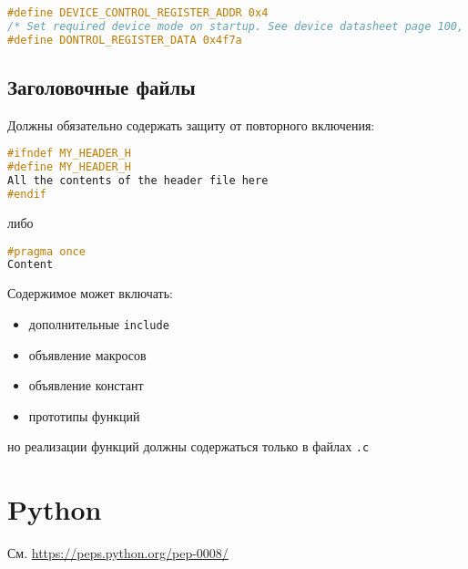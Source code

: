 \begin{lstlisting}[language=C]
#define DEVICE_CONTROL_REGISTER_ADDR 0x4
/* Set required device mode on startup. See device datasheet page 100, table 20. */
#define DONTROL_REGISTER_DATA 0x4f7a
\end{lstlisting}

\subsection*{Заголовочные файлы}

Должны обязательно содержать защиту от повторного включения:
\begin{lstlisting}[language=C]
#ifndef MY_HEADER_H
#define MY_HEADER_H
All the contents of the header file here
#endif
\end{lstlisting}

либо

\begin{lstlisting}[language=C]
#pragma once
Content
\end{lstlisting}

Содержимое может включать:
\begin{itemize}
    \item дополнительные \verb|include|
    \item объявление макросов
    \item объявление констант
    \item прототипы функций
\end{itemize}

но реализации функций должны содержаться только в файлах \verb|.c|

\newpage

\section*{Python}
См. \url{https://peps.python.org/pep-0008/}
